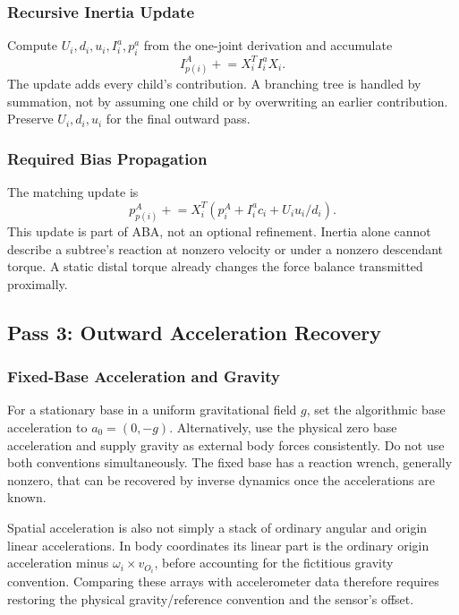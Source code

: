 \subsubsection{Recursive Inertia Update}
\label{subsubsec:inertia_recursion}

Compute $U_i,d_i,u_i,I_i^a,p_i^a$ from the one-joint derivation and accumulate
\begin{equation}
 I_{p(i)}^A\mathrel{+}=X_i^T I_i^a X_i.
 \label{eq:aba_inertia_recursion}
\end{equation}
The update adds every child's contribution. A branching tree is handled by summation, not by assuming one child or by overwriting an earlier contribution. Preserve $U_i,d_i,u_i$ for the final outward pass.

\subsubsection{Required Bias Propagation}
\label{subsubsec:bias_propagation}

The matching update is
\begin{equation}
 p_{p(i)}^A\mathrel{+}=X_i^T
 \left(p_i^A+I_i^a c_i+U_i u_i/d_i\right).
\end{equation}
This update is part of ABA, not an optional refinement. Inertia alone cannot describe a subtree's reaction at nonzero velocity or under a nonzero descendant torque. A static distal torque already changes the force balance transmitted proximally.

\subsection{Pass 3: Outward Acceleration Recovery}
\label{subsec:pass3_outward}

\subsubsection{Fixed-Base Acceleration and Gravity}
\label{subsubsec:base_acceleration}

For a stationary base in a uniform gravitational field $g$, set the algorithmic base acceleration to $a_0=(0,-g)$. Alternatively, use the physical zero base acceleration and supply gravity as external body forces consistently. Do not use both conventions simultaneously. The fixed base has a reaction wrench, generally nonzero, that can be recovered by inverse dynamics once the accelerations are known.

Spatial acceleration is also not simply a stack of ordinary angular and origin linear accelerations. In body coordinates its linear part is the ordinary origin acceleration minus $\omega_i\times v_{O_i}$, before accounting for the fictitious gravity convention. Comparing these arrays with accelerometer data therefore requires restoring the physical gravity/reference convention and the sensor's offset.

